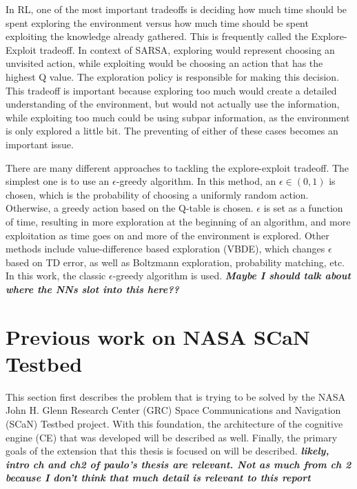 	\par In RL, one of the most important tradeoffs is deciding how much time should be spent exploring the environment versus how much time should be spent exploiting the knowledge already gathered. This is frequently called the Explore-Exploit tradeoff. In context of SARSA, exploring would represent choosing an unvisited action, while exploiting would be choosing an action that has the highest Q value. The exploration policy is responsible for making this decision. This tradeoff is important because exploring too much would create a detailed understanding of the environment, but would not actually use the information, while exploiting too much could be using subpar information, as the environment is only explored a little bit. The preventing of either of these cases becomes an important issue. 
	\par There are many different approaches to tackling the explore-exploit tradeoff. The simplest one is to use an $\epsilon$-greedy algorithm. In this method, an $\epsilon \in (0,1)$ is chosen, which is the probability of choosing a uniformly random action. Otherwise, a greedy action based on the Q-table is chosen. $\epsilon$ is set as a function of time, resulting in more exploration at the beginning of an algorithm, and more exploitation as time goes on and more of the environment is explored. Other methods include value-difference based exploration (VBDE), which changes $\epsilon$ based on TD error, as well as Boltzmann exploration, probability matching, etc. In this work, the classic $\epsilon$-greedy algorithm is used. 
	\textbf{\textit{Maybe I should talk about where the NNs slot into this here??}}
	
	\section{Previous work on NASA SCaN Testbed}
	\par This section first describes the problem that is trying to be solved by the NASA John H. Glenn Research Center (GRC) Space Communications and Navigation (SCaN) Testbed project. With this foundation, the architecture of the cognitive engine (CE) that was developed will be described as well. Finally, the primary goals of the extension that this thesis is focused on will be described.
	\textbf{\textit{likely, intro ch and ch2 of paulo's thesis are relevant. Not as much from ch 2 because I don't think that much detail is relevant to this report}}
